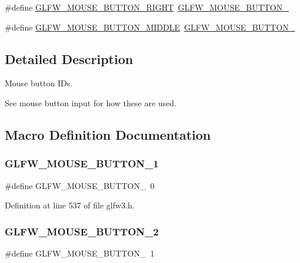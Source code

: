\begin{DoxyCompactItemize}
\item 
\#define \mbox{\hyperlink{group__buttons_ga3e2f2cf3c4942df73cc094247d275e74}{G\+L\+F\+W\+\_\+\+M\+O\+U\+S\+E\+\_\+\+B\+U\+T\+T\+O\+N\+\_\+\+R\+I\+G\+HT}}~\mbox{\hyperlink{group__buttons_ga604b39b92c88ce9bd332e97fc3f4156c}{G\+L\+F\+W\+\_\+\+M\+O\+U\+S\+E\+\_\+\+B\+U\+T\+T\+O\+N\+\_}}
\item 
\#define \mbox{\hyperlink{group__buttons_ga34a4d2a701434f763fd93a2ff842b95a}{G\+L\+F\+W\+\_\+\+M\+O\+U\+S\+E\+\_\+\+B\+U\+T\+T\+O\+N\+\_\+\+M\+I\+D\+D\+LE}}~\mbox{\hyperlink{group__buttons_ga0130d505563d0236a6f85545f19e1721}{G\+L\+F\+W\+\_\+\+M\+O\+U\+S\+E\+\_\+\+B\+U\+T\+T\+O\+N\+\_}}
\end{DoxyCompactItemize}


\subsection{Detailed Description}
Mouse button I\+Ds. 

See mouse button input for how these are used. 

\subsection{Macro Definition Documentation}
\mbox{\label{group__buttons_ga181a6e875251fd8671654eff00f9112e}} 
\subsubsection{\texorpdfstring{GLFW\_MOUSE\_BUTTON\_1}{GLFW\_MOUSE\_BUTTON\_1}}
{\footnotesize\ttfamily \#define G\+L\+F\+W\+\_\+\+M\+O\+U\+S\+E\+\_\+\+B\+U\+T\+T\+O\+N\+\_~0}



Definition at line 537 of file glfw3.\+h.

\mbox{\label{group__buttons_ga604b39b92c88ce9bd332e97fc3f4156c}} 
\subsubsection{\texorpdfstring{GLFW\_MOUSE\_BUTTON\_2}{GLFW\_MOUSE\_BUTTON\_2}}
{\footnotesize\ttfamily \#define G\+L\+F\+W\+\_\+\+M\+O\+U\+S\+E\+\_\+\+B\+U\+T\+T\+O\+N\+\_~1}



